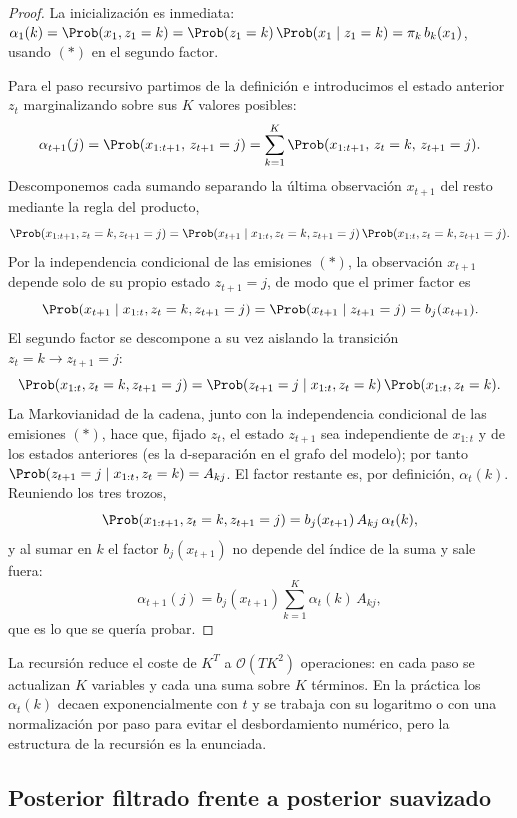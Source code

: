 \begin{proof}
La inicialización es inmediata: $\alpha_1(k) = \Prob(x_1, z_1 = k) = \Prob(z_1 = k)\,\Prob(x_1 \mid z_1 = k) = \pi_k\, b_k(x_1)$, usando $(\ast)$ en el segundo factor.

Para el paso recursivo partimos de la definición e introducimos el estado anterior $z_t$ marginalizando sobre sus $K$ valores posibles:
\[
\alpha_{t+1}(j)
= \Prob(x_{1:t+1},\, z_{t+1} = j)
= \sum_{k=1}^{K} \Prob(x_{1:t+1},\, z_t = k,\, z_{t+1} = j).
\]
Descomponemos cada sumando separando la última observación $x_{t+1}$ del resto mediante la regla del producto,
\[
\Prob(x_{1:t+1}, z_t = k, z_{t+1} = j)
= \Prob(x_{t+1} \mid x_{1:t}, z_t = k, z_{t+1} = j)\,
  \Prob(x_{1:t}, z_t = k, z_{t+1} = j).
\]
Por la independencia condicional de las emisiones $(\ast)$, la observación $x_{t+1}$ depende solo de su propio estado $z_{t+1} = j$, de modo que el primer factor es
\[
\Prob(x_{t+1} \mid x_{1:t}, z_t = k, z_{t+1} = j) = \Prob(x_{t+1} \mid z_{t+1} = j) = b_j(x_{t+1}).
\]
El segundo factor se descompone a su vez aislando la transición $z_t = k \to z_{t+1} = j$:
\[
\Prob(x_{1:t}, z_t = k, z_{t+1} = j)
= \Prob(z_{t+1} = j \mid x_{1:t}, z_t = k)\, \Prob(x_{1:t}, z_t = k).
\]
La Markovianidad de la cadena, junto con la independencia condicional de las emisiones $(\ast)$, hace que, fijado $z_t$, el estado $z_{t+1}$ sea independiente de $x_{1:t}$ y de los estados anteriores (es la d-separación en el grafo del modelo); por tanto $\Prob(z_{t+1} = j \mid x_{1:t}, z_t = k) = A_{kj}$. El factor restante es, por definición, $\alpha_t(k)$. Reuniendo los tres trozos,
\[
\Prob(x_{1:t+1}, z_t = k, z_{t+1} = j) = b_j(x_{t+1})\, A_{kj}\, \alpha_t(k),
\]
y al sumar en $k$ el factor $b_j(x_{t+1})$ no depende del índice de la suma y sale fuera:
\[
\alpha_{t+1}(j) = b_j(x_{t+1}) \sum_{k=1}^{K} \alpha_t(k)\, A_{kj},
\]
que es lo que se quería probar.
\end{proof}

La recursión reduce el coste de $K^T$ a $\mathcal{O}(T K^2)$ operaciones: en cada paso se actualizan $K$ variables y cada una suma sobre $K$ términos. En la práctica los $\alpha_t(k)$ decaen exponencialmente con $t$ y se trabaja con su logaritmo o con una normalización por paso para evitar el desbordamiento numérico, pero la estructura de la recursión es la enunciada.

\subsection{Posterior filtrado frente a posterior suavizado}
\label{sec:hmm-filtrado}

